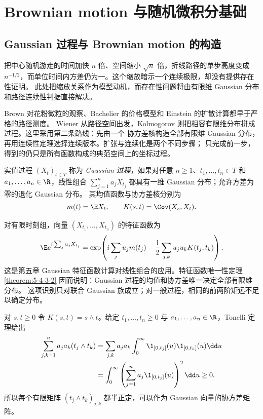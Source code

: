 \section{Brownian motion 与随机微积分基础}\label{sec:06-04}

\subsection{Gaussian 过程与 Brownian motion 的构造}\label{subsec:6-4-1}

把中心随机游走的时间加快 $n$ 倍、空间缩小 $\sqrt n$ 倍，折线路径的单步高度变成
$n^{-1/2}$，而单位时间内方差仍为一。这个缩放暗示一个连续极限，却没有提供存在性证明。
此处把缩放关系作为模型动机，而存在性问题将由有限维 Gaussian 分布和路径连续性判据直接解决。

Brown 对花粉微粒的观察、Bachelier 的价格模型和 Einstein 的扩散计算都早于严格的路径测度。
Wiener 从路径空间出发，Kolmogorov 则把相容有限维分布拼成过程。这里采用第二条路线：先由一个
协方差核构造全部有限维 Gaussian 分布，再用连续性定理选择连续版本。扩张与连续化是两个不同步骤；
只完成前一步，得到的仍只是所有函数构成的典范空间上的坐标过程。

\begin{definition}[Gaussian 过程]\label{def:6-4-1-1}
实值过程 $(X_t)_{t\in T}$ 称为 \emph{Gaussian 过程}，如果对任意
$n\ge1$、$t_1,\ldots,t_n\in T$ 和 $a_1,\ldots,a_n\in\R$，线性组合
$\sum_{j=1}^na_jX_{t_j}$ 都具有一维 Gaussian 分布；允许方差为零的退化 Gaussian 分布。
其均值函数与协方差核分别为
\[
 m(t)=\E X_t,
 \qquad K(s,t)=\Cov(X_s,X_t).
\]
\end{definition}

对有限时刻组，向量 $(X_{t_1},\ldots,X_{t_n})$ 的特征函数为
\begin{equation}\label{eq:6-4-1-gaussian-fdd-cf}
 \E e^{i\sum_ju_jX_{t_j}}
 =\exp\!\left(i\sum_ju_jm(t_j)
 -\frac12\sum_{j,k}u_ju_kK(t_j,t_k)\right).
\end{equation}
这是第五章 Gaussian 特征函数计算对线性组合的应用。特征函数唯一性定理
\ref{theorem:5-4-3-2} 因而说明：Gaussian 过程的均值和协方差唯一决定全部有限维分布。
这项识别只对联合 Gaussian 族成立；对一般过程，相同的前两阶矩远不足以确定分布。

\begin{example}[协方差核]\label{ex:6-4-1-1}
对 $s,t\ge0$ 令 $K(s,t)=s\wedge t$。给定 $t_1,\ldots,t_n\ge0$ 与
$a_1,\ldots,a_n\in\R$，Tonelli 定理给出
\begin{align*}
 \sum_{j,k=1}^na_ja_k(t_j\wedge t_k)
 &=\sum_{j,k}a_ja_k\int_0^\infty
   \1_{[0,t_j]}(u)\1_{[0,t_k]}(u)\dd u\\
 &=\int_0^\infty\left(\sum_{j=1}^na_j\1_{[0,t_j]}(u)\right)^2\dd u
 \ge0.
\end{align*}
所以每个有限矩阵 $(t_j\wedge t_k)_{j,k}$ 都半正定，可以作为 Gaussian 向量的协方差矩阵。
\end{example}


